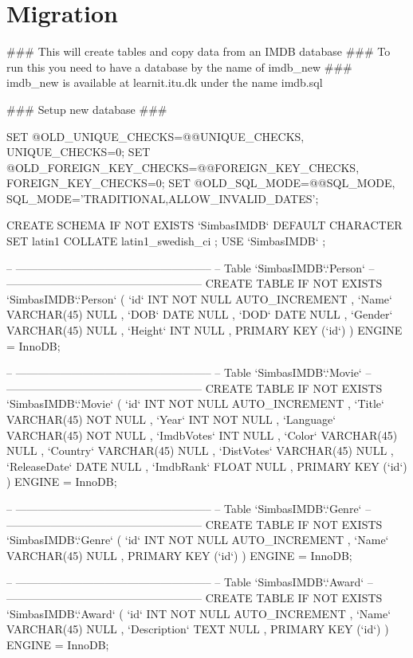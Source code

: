 \section{Migration}
\begin{spverbatim}
### This will create tables and copy data from an IMDB database 
### To run this you need to have a database by the name of imdb_new
### imdb_new is available at learnit.itu.dk under the name imdb.sql

### Setup new database ###

SET @OLD_UNIQUE_CHECKS=@@UNIQUE_CHECKS, UNIQUE_CHECKS=0;
SET @OLD_FOREIGN_KEY_CHECKS=@@FOREIGN_KEY_CHECKS, FOREIGN_KEY_CHECKS=0;
SET @OLD_SQL_MODE=@@SQL_MODE, SQL_MODE='TRADITIONAL,ALLOW_INVALID_DATES';

CREATE SCHEMA IF NOT EXISTS `SimbasIMDB` DEFAULT CHARACTER SET latin1 COLLATE latin1_swedish_ci ;
USE `SimbasIMDB` ;

-- -----------------------------------------------------
-- Table `SimbasIMDB`.`Person`
-- -----------------------------------------------------
CREATE  TABLE IF NOT EXISTS `SimbasIMDB`.`Person` (
  `id` INT NOT NULL AUTO_INCREMENT ,
  `Name` VARCHAR(45) NULL ,
  `DOB` DATE NULL ,
  `DOD` DATE NULL ,
  `Gender` VARCHAR(45) NULL ,
  `Height` INT NULL ,
  PRIMARY KEY (`id`) )
ENGINE = InnoDB;


-- -----------------------------------------------------
-- Table `SimbasIMDB`.`Movie`
-- -----------------------------------------------------
CREATE  TABLE IF NOT EXISTS `SimbasIMDB`.`Movie` (
  `id` INT NOT NULL AUTO_INCREMENT ,
  `Title` VARCHAR(45) NOT NULL ,
  `Year` INT NOT NULL ,
  `Language` VARCHAR(45) NOT NULL ,
  `ImdbVotes` INT NULL ,
  `Color` VARCHAR(45) NULL ,
  `Country` VARCHAR(45) NULL ,
  `DistVotes` VARCHAR(45) NULL ,
  `ReleaseDate` DATE NULL ,
  `ImdbRank` FLOAT NULL ,
  PRIMARY KEY (`id`) )
ENGINE = InnoDB;


-- -----------------------------------------------------
-- Table `SimbasIMDB`.`Genre`
-- -----------------------------------------------------
CREATE  TABLE IF NOT EXISTS `SimbasIMDB`.`Genre` (
  `id` INT NOT NULL AUTO_INCREMENT ,
  `Name` VARCHAR(45) NULL ,
  PRIMARY KEY (`id`) )
ENGINE = InnoDB;


-- -----------------------------------------------------
-- Table `SimbasIMDB`.`Award`
-- -----------------------------------------------------
CREATE  TABLE IF NOT EXISTS `SimbasIMDB`.`Award` (
  `id` INT NOT NULL AUTO_INCREMENT ,
  `Name` VARCHAR(45) NULL ,
  `Description` TEXT NULL ,
  PRIMARY KEY (`id`) )
ENGINE = InnoDB;



\end{spverbatim}

